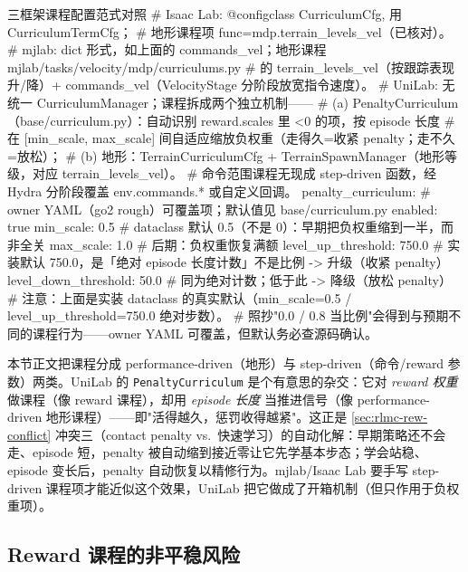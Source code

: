 \begin{codebox}[Python]{三框架课程配置范式对照}
# Isaac Lab: @configclass CurriculumCfg, 用 CurriculumTermCfg；
#   地形课程项 func=mdp.terrain_levels_vel（已核对）。
# mjlab: dict 形式，如上面的 commands_vel；地形课程 mjlab/tasks/velocity/mdp/curriculums.py
#   的 terrain_levels_vel（按跟踪表现升/降）+ commands_vel（VelocityStage 分阶段放宽指令速度）。
# UniLab: 无统一 CurriculumManager；课程拆成两个独立机制——
#   (a) PenaltyCurriculum（base/curriculum.py）：自动识别 reward.scales 里 <0 的项，按 episode 长度
#       在 [min_scale, max_scale] 间自适应缩放负权重（走得久=收紧 penalty；走不久=放松）；
#   (b) 地形：TerrainCurriculumCfg + TerrainSpawnManager（地形等级，对应 terrain_levels_vel）。
#   命令范围课程无现成 step-driven 函数，经 Hydra 分阶段覆盖 env.commands.* 或自定义回调。
penalty_curriculum:                  # owner YAML（go2 rough）可覆盖项；默认值见 base/curriculum.py
  enabled: true
  min_scale: 0.5                     # dataclass 默认 0.5（不是 0）：早期把负权重缩到一半，而非全关
  max_scale: 1.0                     # 后期：负权重恢复满额
  level_up_threshold: 750.0          # 实装默认 750.0，是「绝对 episode 长度计数」不是比例 -> 升级（收紧 penalty）
  level_down_threshold: 50.0         # 同为绝对计数；低于此 -> 降级（放松 penalty）
# 注意：上面是实装 dataclass 的真实默认（min_scale=0.5 / level_up_threshold=750.0 绝对步数）。
#   照抄"0.0 / 0.8 当比例"会得到与预期不同的课程行为——owner YAML 可覆盖，但默认务必查源码确认。
\end{codebox}

\begin{insight}\label{ins:rlmc-rew-penaltycurr}
本节正文把课程分成 performance-driven（地形）与 step-driven（命令/reward 参数）两类。UniLab 的 \verb|PenaltyCurriculum| 是个有意思的杂交：它对 \emph{reward 权重} 做课程（像 reward 课程），却用 \emph{episode 长度} 当推进信号（像 performance-driven 地形课程）——即"活得越久，惩罚收得越紧"。这正是 \cref{sec:rlmc-rew-conflict} 冲突三（contact penalty vs.\ 快速学习）的自动化解：早期策略还不会走、episode 短，penalty 被自动缩到接近零让它先学基本步态；学会站稳、episode 变长后，penalty 自动恢复以精修行为。mjlab/Isaac Lab 要手写 step-driven 课程项才能近似这个效果，UniLab 把它做成了开箱机制（但只作用于负权重项）。
\end{insight}

\subsection{Reward 课程的非平稳风险}
\label{sec:rlmc-rew-nonstationary}

